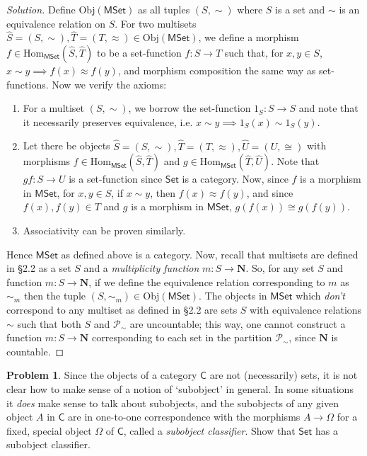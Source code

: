 \documentclass[fontsize=14pt]{scrartcl}
\theoremstyle{definition}
\newtheorem{problem-internal}{Problem}[subsection]
\newenvironment{problem}{
  \medskip
  \begin{problem-internal}
}{
  \end{problem-internal}
}
\newenvironment{solution}{
  \begin{proof}[Solution]
  \vspace{-8px}
  \setlength{\parskip}{4px}
  \setlength{\parindent}{0px}
}{
  \end{proof}
}
\newcommand{\Obj}{\mathrm{Obj}}
\newcommand{\Hom}{\mathrm{Hom}}
\begin{document}
\begin{solution}
\def \Set {\mathsf{Set}}
\def \MSet {\mathsf{MSet}}

Define $\Obj(\MSet)$ as all tuples $(S, \sim)$ where $S$ is a set and $\sim$ is
an equivalence relation on $S$. For two multisets $\hat{S} = (S,\sim), \hat{T} =
(T,\approx) \in \Obj(\MSet)$, we define a morphism
$f\in\Hom_\MSet(\hat{S},\hat{T})$ to be a set-function $f:S\to T$ such that, for
$x,y\in S$, $x\sim y\implies f(x)\approx f(y)$, and morphism composition the
same way as set-functions. Now we verify the axioms:

\begin{enumerate}
\item For a multiset $(S,\sim)$, we borrow the set-function $1_S:S\to S$ and
note that it necessarily preserves equivalence, i.e. $x\sim y\implies 1_S(x)\sim
1_S(y)$.
\item Let there be objects $\hat{S}=(S,\sim), \hat{T}=(T,\approx),
\hat{U}=(U,\cong)$ with morphisms $f\in\Hom_\MSet(\hat{S},\hat{T})$ and
$g\in\Hom_\MSet(\hat{T},\hat{U})$. Note that $gf:S\to U$ is a set-function since
$\Set$ is a category. Now, since $f$ is a morphism in $\MSet$, for
$x,y\in S$, if $x\sim y$, then $f(x)\approx f(y)$, and since $f(x),f(y)\in T$
and $g$ is a morphism in $\MSet$, $g(f(x))\cong g(f(y))$.
\item Associativity can be proven similarly.
\end{enumerate}

Hence $\MSet$ as defined above is a category. Now, recall that multisets are
defined in \S2.2 as a set $S$ and a \textit{multiplicity function}
$m:S\to\mathbf{N}$. So, for any set $S$ and function $m:S\to\mathbf{N}$, if we
define the equivalence relation corresponding to $m$ as $\sim_m$ then the
tuple $(S,\sim_m)\in\Obj(\MSet)$. The objects in $\MSet$ which
\textit{don't} correspond to any multiset as defined in \S2.2 are sets $S$ with
equivalence relations $\sim$ such that both $S$ and $\mathscr{P}_\sim$ are
uncountable; this way, one cannot construct a function $m:S\to\mathbf{N}$
corresponding to each set in the partition $\mathscr{P}_\sim$, since
$\mathbf{N}$ is countable.
\end{solution}


\begin{problem}
\def \C {\mathsf{C}}
\def \Set {\mathsf{Set}}

Since the objects of a category $\C$ are not (necessarily) sets, it is not clear
how to make sense of a notion of `subobject' in general. In some situations it
\textit{does} make sense to talk about subobjects, and the subobjects of any
given object $A$ in $\C$ are in one-to-one correspondence with the morphisms
$A\to\Omega$ for a fixed, special object $\Omega$ of $\C$, called a
\textit{subobject classifier}. Show that $\Set$ has a subobject classifier.
\end{problem}
\end{document}
